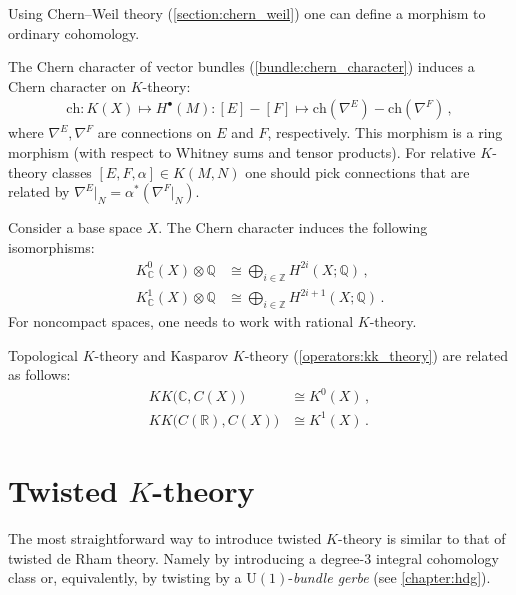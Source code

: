 {    Using Chern--Weil theory (\cref{section:chern_weil}) one can define a morphism to ordinary cohomology.
    \begin{construct}\label{k:chern_character}
        The Chern character of vector bundles (\cref{bundle:chern_character}) induces a Chern character on $K$-theory:
        \begin{gather}
            \mathrm{ch}:K(X)\mapsto H^\bullet(M):[E]-[F]\mapsto \mathrm{ch}(\nabla^E)-\mathrm{ch}(\nabla^F)\,,
        \end{gather}
        where $\nabla^E,\nabla^F$ are connections on $E$ and $F$, respectively. This morphism is a ring morphism (with respect to Whitney sums and tensor products). For relative $K$-theory classes $[E,F,\alpha]\in K(M,N)$ one should pick connections that are related by $\nabla^E|_N=\alpha^*(\nabla^F|_N)$.
    \end{construct}
    \begin{theorem}
        Consider a base space $X$. The Chern character induces the following isomorphisms:
        \begin{align}
            K^0_{\mathbb{C}}(X)\otimes\mathbb{Q}&\cong\bigoplus_{i\in\mathbb{Z}}H^{2i}(X;\mathbb{Q})\,,\\
            K^1_{\mathbb{C}}(X)\otimes\mathbb{Q}&\cong\bigoplus_{i\in\mathbb{Z}}H^{2i+1}(X;\mathbb{Q})\,.
        \end{align}
        For noncompact spaces, one needs to work with rational $K$-theory.
    \end{theorem}

    \begin{property}[$K\!K$-theory]\label{k:topological_kk_theory}
        Topological $K$-theory and Kasparov $K$-theory (\cref{operators:kk_theory}) are related as follows:
        \begin{align}
            K\!K\bigl(\mathbb{C},C(X)\bigr)&\cong K^0(X)\,,\\
            K\!K\bigl(C(\mathbb{R}),C(X)\bigr)&\cong K^1(X)\,.
        \end{align}
    \end{property}

\section{\texorpdfstring{Twisted $K$-theory}{Twisted K-theory}}

    The most straightforward way to introduce twisted $K$-theory is similar to that of twisted de Rham theory. Namely by introducing a degree-3 integral cohomology class or, equivalently, by twisting by a $\mathrm{U}(1)$-\textit{bundle gerbe} (see \cref{chapter:hdg}).

}
